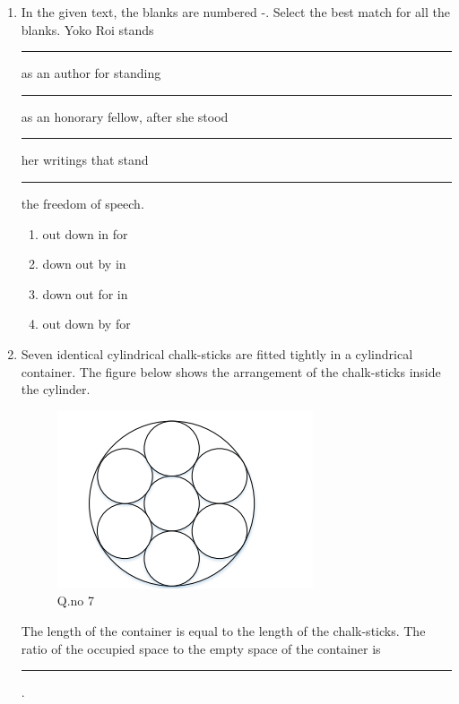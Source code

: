 \documentclass[journal,12pt,onecolumn]{IEEEtran}
\theoremstyle{remark}
\begin{document}
\begin{enumerate}
\item In the given text, the blanks are numbered -. Select the best match for all the blanks.
Yoko Roi stands \rule{1cm}{0.15mm}  as an author for standing \rule{1cm}{0.15mm}  as an honorary fellow, after she stood \rule{1cm}{0.15mm}  her writings that stand \rule{1cm}{0.15mm}  the freedom of speech. \hfill{}
\begin{enumerate}
    \item {} out  down  in  for
    \item {} down  out  by  in
    \item {} down  out  for  in
    \item {} out  down  by  for
\end{enumerate}

\item Seven identical cylindrical chalk-sticks are fitted tightly in a cylindrical container. The figure below shows the arrangement of the chalk-sticks inside the cylinder.
\begin{figure}[h!]
    \centering
    \includegraphics[width= 0.4\columnwidth]{figs/circle.png}
    \caption*{Q.no 7}
    \label{fig:q7}
\end{figure}
The length of the container is equal to the length of the chalk-sticks. The ratio of the occupied space to the empty space of the container is \rule{3cm}{0.15mm}. \hfill{}
\begin{enumerate}
\end{enumerate}


\end{enumerate}
\end{document}
